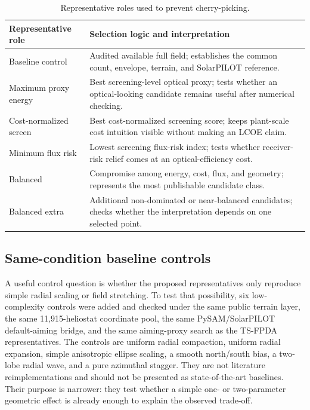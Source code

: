 \documentclass[final,3p,times]{elsarticle}
\begin{document}
\begin{table}[t]
\centering
\caption{Representative roles used to prevent cherry-picking.}
\label{tab:representative-roles}
\small
\begin{tabular}{p{}p{}}
\toprule
Representative role & Selection logic and interpretation \\
\midrule
Baseline control & Audited available full field; establishes the common count, envelope, terrain, and SolarPILOT reference. \\
Maximum proxy energy & Best screening-level optical proxy; tests whether an optical-looking candidate remains useful after numerical checking. \\
Cost-normalized screen & Best cost-normalized screening score; keeps plant-scale cost intuition visible without making an LCOE claim. \\
Minimum flux risk & Lowest screening flux-risk index; tests whether receiver-risk relief comes at an optical-efficiency cost. \\
Balanced & Compromise among energy, cost, flux, and geometry; represents the most publishable candidate class. \\
Balanced extra & Additional non-dominated or near-balanced candidates; checks whether the interpretation depends on one selected point. \\
\bottomrule
\end{tabular}
\end{table}

\subsection{Same-condition baseline controls}
A useful control question is whether the proposed representatives only reproduce simple radial scaling or field stretching. To test that possibility, six low-complexity controls were added and checked under the same public terrain layer, the same 11,915-heliostat coordinate pool, the same PySAM/SolarPILOT default-aiming bridge, and the same aiming-proxy search as the TS-FPDA representatives. The controls are uniform radial compaction, uniform radial expansion, simple anisotropic ellipse scaling, a smooth north/south bias, a two-lobe radial wave, and a pure azimuthal stagger. They are not literature reimplementations and should not be presented as state-of-the-art baselines. Their purpose is narrower: they test whether a simple one- or two-parameter geometric effect is already enough to explain the observed trade-off.
\end{document}

